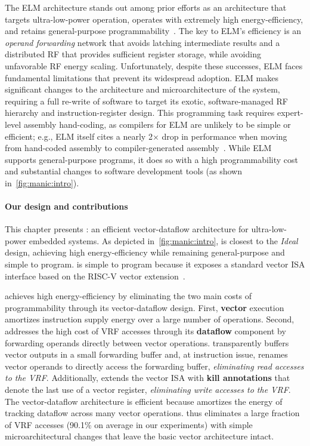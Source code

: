 The ELM architecture stands out among prior efforts as an architecture that
targets ultra-low-power operation, operates with extremely high
energy-efficiency, and retains general-purpose
programmability~\cite{balfour_elm_thesis,balfour2008energy}.
%
The key to ELM's efficiency is an \emph{operand forwarding} network that avoids
latching intermediate results and a distributed RF that provides
sufficient register storage, while avoiding unfavorable RF energy scaling. 
%
Unfortunately, despite these successes, ELM faces fundamental limitations that prevent its
widespread adoption.
%
ELM makes significant changes to the architecture and microarchitecture of the
system, requiring a full re-write of software to target its exotic,
software-managed RF hierarchy and instruction-register design.  This programming task
requires expert-level assembly hand-coding,
as compilers for ELM are unlikely to be simple or efficient;
e.g., ELM itself cites a nearly 2$\times$ drop in performance when moving from hand-coded assembly to compiler-generated assembly~\cite{balfour2008energy}.
%
While ELM supports general-purpose programs, it does so with a high
programmability cost and substantial changes to software development tools (as shown in~\autoref{fig:manic:intro}).

\figMANICDesignSpace

\paragraph{Our design and contributions}
This chapter presents \manic: an efficient vector-dataflow
architecture for ultra-low-power embedded systems.  
%
As depicted in~\autoref{fig:manic:intro}, \manic is closest to the \textit{Ideal} design, achieving high energy-efficiency while remaining general-purpose and simple to program.
%
%
\manic is simple to program because it exposes a standard vector ISA interface
based on the RISC-V vector extension~\cite{riscv_2019}.

\manic achieves high energy-efficiency by eliminating the two main costs of
programmability through its vector-dataflow design.
%
First, \textbf{vector} execution amortizes
instruction supply energy over a large number of operations.
%
Second, \manic addresses the high cost of VRF accesses
through its \textbf{dataflow} component by forwarding operands 
directly between vector operations.
%
\manic transparently buffers vector outputs in a small {forwarding buffer}
and, at instruction issue, renames vector operands to directly access
the forwarding buffer, \emph{eliminating read accesses to the VRF}.
%
Additionally, \manic extends the vector ISA with \textbf{kill annotations} that denote
the last use of a vector register,
\emph{eliminating write accesses to the VRF}.
%
The vector-dataflow architecture is efficient because \manic amortizes the energy of tracking dataflow across many vector operations.
%
\manic thus eliminates a large fraction of VRF accesses (90.1\% on average in our experiments)
with simple microarchitectural changes that leave the basic vector architecture intact.

